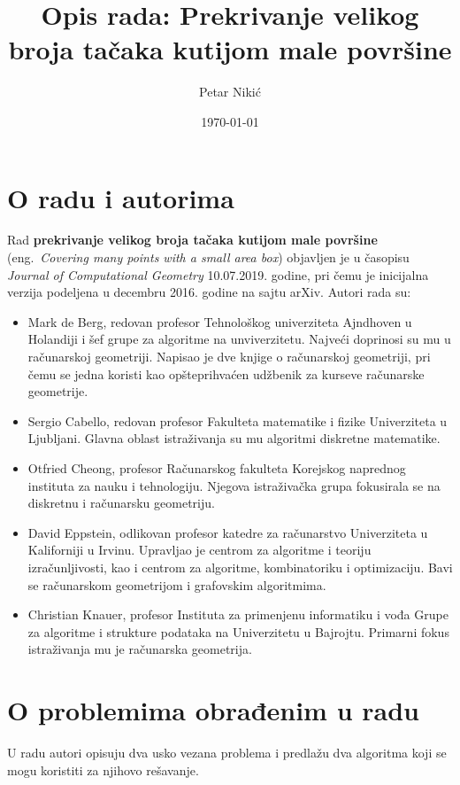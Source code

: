 \documentclass{article}
\title{Opis rada: Prekrivanje velikog broja tačaka kutijom male površine}
\author{Petar Nikić}
\date{\today}
\begin{document}
\maketitle

\section{O radu i autorima}

Rad \textbf{prekrivanje velikog broja tačaka kutijom male površine} (eng.~{\em Covering many points with a small area box})
objavljen je u časopisu {\em Journal of Computational Geometry} 10.07.2019. godine, pri čemu je inicijalna verzija podeljena
u decembru 2016. godine na sajtu arXiv. Autori rada su:

\begin{itemize}
	\item Mark de Berg, redovan profesor Tehnološkog univerziteta Ajndhoven u Holandiji i šef grupe za algoritme na unviverzitetu.
	Najveći doprinosi su mu u računarskoj geometriji. Napisao je dve knjige o računarskoj geometriji, pri čemu se jedna koristi kao
	opšteprihvaćen udžbenik za kurseve računarske geometrije.
	\item Sergio Cabello, redovan profesor Fakulteta matematike i fizike Univerziteta u Ljubljani. Glavna oblast istraživanja su
	mu algoritmi diskretne matematike.
	\item Otfried Cheong, profesor Računarskog fakulteta Korejskog naprednog instituta za nauku i tehnologiju. Njegova istraživačka
	grupa fokusirala se na diskretnu i računarsku geometriju.
	\item David Eppstein, odlikovan profesor katedre za računarstvo Univerziteta u Kaliforniji u Irvinu. Upravljao je centrom
	za algoritme i teoriju izračunljivosti, kao i centrom za algoritme, kombinatoriku i optimizaciju. Bavi se računarskom geometrijom
	i grafovskim algoritmima.
	\item Christian Knauer, profesor Instituta za primenjenu informatiku i vođa Grupe za algoritme i strukture podataka na Univerzitetu
	u Bajrojtu. Primarni fokus istraživanja mu je računarska geometrija.
\end{itemize}

\section{O problemima obrađenim u radu}

U radu autori opisuju dva usko vezana problema i predlažu dva algoritma koji se mogu koristiti za njihovo rešavanje.
\end{document}
